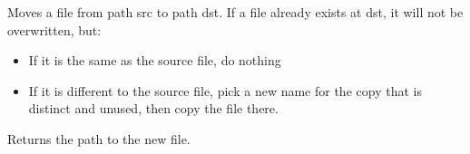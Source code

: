 \documentclass[letterpaper,10pt,english]{sphinxmanual}
\begin{document}
\begin{fulllineitems}
\label{\detokenize{classes:classes.Utils.lg2ct}}
\pysigstartsignatures
{}
\pysigstopsignatures
\end{fulllineitems}


\begin{fulllineitems}
\label{\detokenize{classes:classes.Utils.ll2sphere_xyz}}
\pysigstartsignatures
{}
\pysigstopsignatures
\end{fulllineitems}


\begin{fulllineitems}
\label{\detokenize{classes:classes.Utils.move}}
\pysigstartsignatures
{}
\pysigstopsignatures
\sphinxAtStartPar
Moves a file from path src to path dst.
If a file already exists at dst, it will not be overwritten, but:
\begin{itemize}
\item {} 
\sphinxAtStartPar
If it is the same as the source file, do nothing

\item {} 
\sphinxAtStartPar
If it is different to the source file, pick a new name for the copy that
is distinct and unused, then copy the file there.

\end{itemize}

\sphinxAtStartPar
Returns the path to the new file.

\end{fulllineitems}

\end{document}
